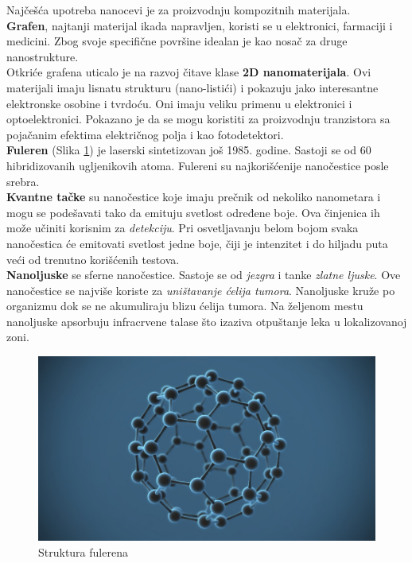 \documentclass[a4paper]{article}
\begin{document}
{Najčešća upotreba nanocevi je za proizvodnju kompozitnih materijala.\\

\textbf{Grafen}, najtanji materijal ikada napravljen, koristi se u elektronici, farmaciji i medicini. Zbog svoje specifične površine idealan je kao nosač za druge nanostrukture.\\

Otkriće grafena uticalo je na razvoj čitave klase \textbf{2D nanomaterijala}. Ovi materijali imaju lisnatu strukturu (nano-listići) i pokazuju jako interesantne elektronske osobine i tvrdoću. Oni imaju veliku primenu u elektronici i optoelektronici. Pokazano je da se mogu koristiti za proizvodnju tranzistora sa pojačanim efektima električnog polja i kao fotodetektori.\\

\textbf{Fuleren} (Slika \ref{slika_fuleren}) je laserski sintetizovan još 1985. godine. Sastoji se od 60 hibridizovanih ugljenikovih atoma. Fulereni su najkorišćenije nanočestice posle srebra.\\ 

\textbf{Kvantne tačke} su nanočestice koje imaju prečnik od nekoliko nanometara i mogu se podešavati tako da emituju svetlost određene boje. Ova činjenica ih može učiniti korisnim za \emph{detekciju}. Pri osvetljavanju belom bojom svaka nanočestica će emitovati svetlost jedne boje, čiji je intenzitet i do hiljadu puta veći od trenutno korišćenih testova.\\

\textbf{Nanoljuske} se sferne nanočestice. Sastoje se od \emph{jezgra} i tanke \emph{zlatne ljuske}. Ove nanočestice se najviše koriste za \emph{uništavanje ćelija tumora}. Nanoljuske kruže po organizmu dok se ne akumuliraju blizu ćelija tumora. Na željenom mestu nanoljuske apsorbuju infracrvene talase što izaziva otpuštanje leka u lokalizovanoj zoni.\\


\begin{figure}[H]
    \centering
    \includegraphics[width=.4\textwidth]{slika 3.jpg}
    \caption{Struktura fulerena}
    \label{slika_fuleren}
\end{figure}

}
\end{document}
